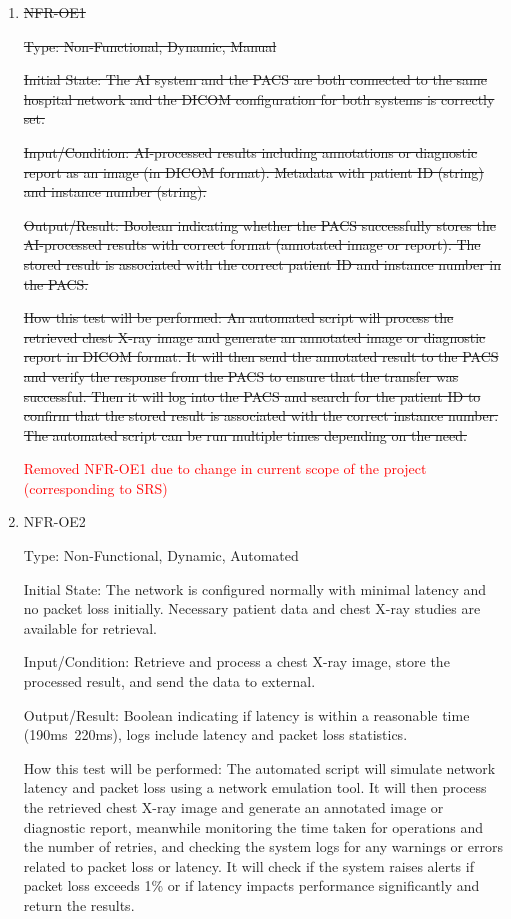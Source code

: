 \documentclass[12pt, titlepage]{article}
\begin{document}
\begin{enumerate}
\begin{enumerate}
  \end{enumerate}  

\item{\sout{NFR-OE1}\\}\label{NFR-OE1}

\sout{Type: Non-Functional, Dynamic, Manual}

\sout{Initial State: The AI system and the PACS are both connected to the same hospital network and the DICOM configuration for both systems is correctly set.}

\sout{Input/Condition: AI-processed results including annotations or diagnostic report as an image (in DICOM format). Metadata with patient ID (string) and instance number (string).}

\sout{Output/Result: Boolean indicating whether the PACS successfully stores the AI-processed results with correct format (annotated image or report). The stored result is associated with the correct patient ID and instance number in the PACS.}

\sout{How this test will be performed: An automated script will process the retrieved chest X-ray image and generate an annotated image or diagnostic report in DICOM format. It will then send the annotated result to the PACS and verify the response from the PACS to ensure that the transfer was successful. Then it will log into the PACS and search for the patient ID to confirm that the stored result is associated with the correct instance number. The automated script can be run multiple times depending on the need.}


\textcolor{red}{Removed NFR-OE1 due to change in current scope of the project (corresponding to SRS)}

\item{NFR-OE2\\}\label{NFR-OE2}

Type: Non-Functional, Dynamic, Automated

Initial State: The network is configured normally with minimal latency and no packet loss initially. Necessary patient data and chest X-ray studies are available for retrieval.

Input/Condition: Retrieve and process a chest X-ray image, store the processed result, and send the data to external.

Output/Result: Boolean indicating if latency is within a reasonable time (190ms~220ms), logs include latency and packet loss statistics.

How this test will be performed: The automated script will simulate network latency and packet loss using a network emulation tool. It will then process the retrieved chest X-ray image and generate an annotated image or diagnostic report, meanwhile monitoring the time taken for operations and the number of retries, and checking the system logs for any warnings or errors related to packet loss or latency. It will check if the system raises alerts if packet loss exceeds 1\% or if latency impacts performance significantly and return the results.

\end{enumerate}
\end{document}
